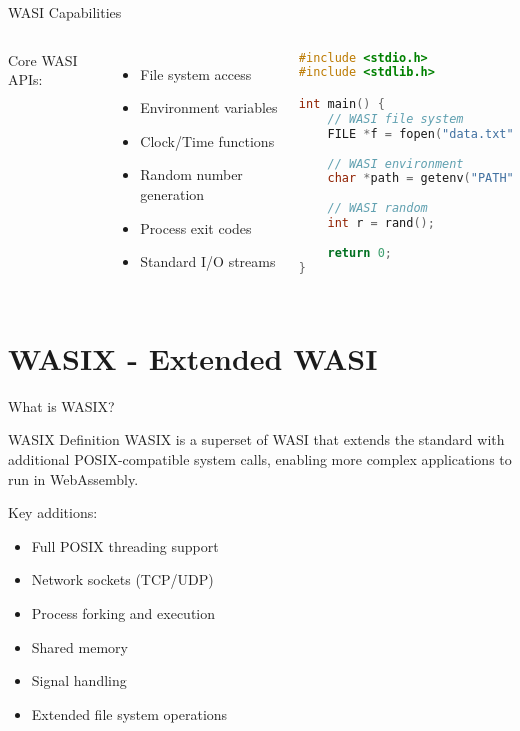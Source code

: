 \documentclass[11pt,aspectratio=169]{beamer}
\begin{document}
\begin{frame}[fragile]{WASI Capabilities}
\begin{columns}
Core WASI APIs:
\begin{itemize}
    \item File system access
    \item Environment variables
    \item Clock/Time functions
    \item Random number generation
    \item Process exit codes
    \item Standard I/O streams
\end{itemize}

\begin{lstlisting}[language=C]
#include <stdio.h>
#include <stdlib.h>

int main() {
    // WASI file system
    FILE *f = fopen("data.txt", "r");
    
    // WASI environment
    char *path = getenv("PATH");
    
    // WASI random
    int r = rand();
    
    return 0;
}
\end{lstlisting}
\end{columns}
\end{frame}

\section{WASIX - Extended WASI}

\begin{frame}{What is WASIX?}
\begin{block}{WASIX Definition}
WASIX is a superset of WASI that extends the standard with additional POSIX-compatible system calls, enabling more complex applications to run in WebAssembly.
\end{block}

Key additions:
\begin{itemize}
    \item Full POSIX threading support
    \item Network sockets (TCP/UDP)
    \item Process forking and execution
    \item Shared memory
    \item Signal handling
    \item Extended file system operations
\end{itemize}
\end{frame}
\end{document}

